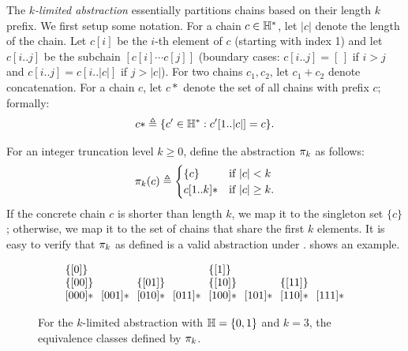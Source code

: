 The {\em $k$-limited abstraction}
essentially partitions chains based on their length $k$ prefix.
We first setup some notation.
For a chain $c \in {\mathbb H}^*$, let $|c|$ denote the length of the chain.
Let $c[i]$ be the $i$-th element of $c$ (starting with index 1) and
let $c[i..j]$ be the subchain $[c[i] \cdots c[j]]$
(boundary cases: $c[i..j] = [\,]$ if $i > j$ and $c[i..j] = c[i..|c|]$ if $j > |c|$).
For two chains $c_1, c_2$, let $c_1+c_2$ denote concatenation.
For a chain $c$, let $c*$ denote the set of all chains
with prefix $c$; formally:
\begin{align}
c* \triangleq \{ c' \in {\mathbb H}^* : c'[1..|c|] = c \}.
\end{align}

For an integer truncation level $k \ge 0$, define the abstraction $\pi_k$ as follows:
\begin{align}
\label{eqn:klimitedAbstraction}
\pi_k(c) \triangleq
\begin{cases}
\{c\}     & \text{if $|c| < k$} \\
c[1..k]*  & \text{if $|c| \ge k$}. \\
\end{cases}
\end{align}
If the concrete chain $c$ is shorter than length $k$,
we map it to the singleton set $\{ c \}$;
otherwise, we map it to the set of chains that share the first $k$ elements.
It is easy to verify that $\pi_k$ as defined is a valid abstraction under .
 shows an example.

\begin{figure}
\[
\arraycolsep=3.5pt
\begin{array}{llllllll}
\{\vec{0}\}    &            &              &            & \{\vec{1}\} \\
\{\vec{00}\}   &            & \{\vec{01}\} &            & \{\vec{10}\} &            & \{\vec{11}\} \\
\vec{000}*     & \vec{001}* & \vec{010}*   & \vec{011}* & \vec{100}*   & \vec{101}* & \vec{110}* & \vec{111}*
\end{array}
\]
\caption{\label{fig:repeatingExample} For the $k$-limited abstraction
with ${\mathbb H} = \{ 0, 1 \}$ and $k = 3$, the equivalence classes defined by $\pi_k$.
}
\end{figure}

